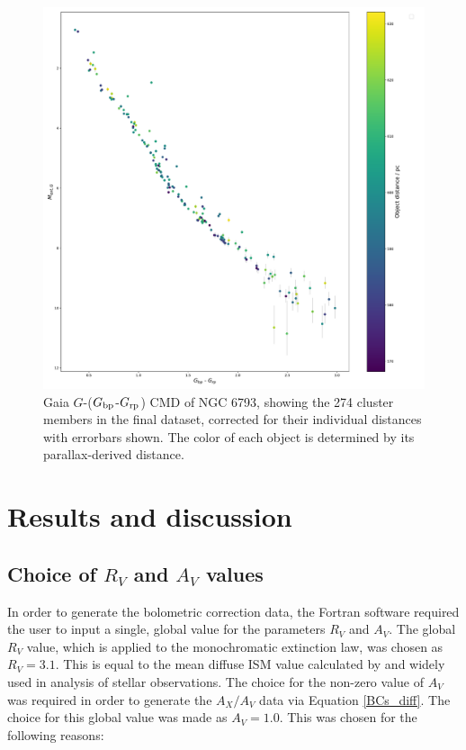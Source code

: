 \documentclass[12pt, a4paper]{report}
\begin{document}
\begin{figure}[h!]
\begin{center}
\includegraphics[width=1.0\textwidth]{../NGC_6793_CMD_observational_errorbars.pdf}
\caption{Gaia $G$-($G_{\textnormal{bp}}$-$G_{\textnormal{rp}}$) CMD of NGC 6793, showing the 274 cluster members in the final dataset, corrected for their individual distances with errorbars shown. The color of each object is determined by its parallax-derived distance.}
\label{NGC_6793_obs_only}
\end{center}
\end{figure}

\chapter{Results and discussion}

\section{Choice of $R_{V}$ and $A_{V}$ values}
In order to generate the bolometric correction data, the Fortran software required the user to input a single, global value for the parameters $R_{V}$ and $A_{V}$. The global $R_{V}$ value, which is applied to the \cite{1989ApJ...345..245C} monochromatic extinction law, was chosen as $R_{V} = 3.1$. This is equal to the mean diffuse ISM value calculated by \cite{1985ApJ...288..618R} and widely used in analysis of stellar observations. The choice for the non-zero value of $A_{V}$ was required in order to generate the $A_{X}/A_{V}$ data via Equation \ref{BCs_diff}. The choice for this global value was made as $A_{V} = 1.0$. This was chosen for the following reasons:
\end{document}
